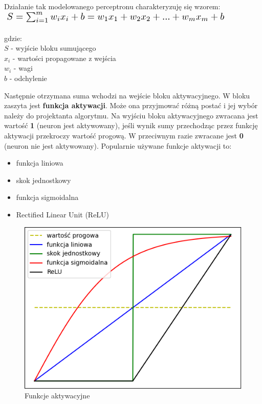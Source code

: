 Działanie tak modelowanego perceptronu charakteryzuję się wzorem:\\

\begin{math}
    \resizebox{0.9\hsize}{!}{$%
    S = \sum_{i = 1}^{m} w_{i}x_{i} + b = w_{1}x_{1} + w_{2}x_{2} + ... + w_{m}x_{m} + b
    $%
    }%
\end{math}\\\\
gdzie:\\
$S$ - wyjście bloku sumującego\\
\begin{math}
x_{i}    
\end{math}
- wartości propagowane z wejścia\\
\begin{math}
w_{i}
\end{math}
- wagi\\
$b$ - odchylenie

Następnie otrzymana suma wchodzi na wejście bloku aktywacyjnego. W bloku zaszyta jest \textbf{funkcja aktywacji}. Może ona przyjmować różną postać i jej wybór należy do projektanta algorytmu. Na wyjściu bloku aktywacyjnego zwracana jest wartość \textbf{1} (neuron jest aktywowany), jeśli wynik sumy przechodząc przez funkcję aktywacji przekroczy wartość progową. W przeciwnym razie zwracane jest \textbf{0} (neuron nie jest aktywowany). Popularnie używane funkcje aktywacji to:

\begin{itemize}
    \item funkcja liniowa
    \item skok jednostkowy
    \item funkcja sigmoidalna
    \item Rectified Linear Unit (ReLU)
\end{itemize}

\begin{figure}[h!]
    \begin{center}
            \includegraphics[scale=0.92]{img/aktywacje1.png}        
    \end{center}
    \caption{Funkcje aktywacyjne}
    \label{fig:aktywacje}
\end{figure}


